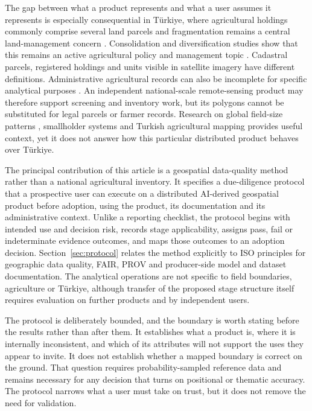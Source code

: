 \documentclass[pdflatex,sn-basic]{sn-jnl}
\begin{document}
The gap between what a product represents and what a user assumes it represents is especially consequential in Türkiye, where agricultural holdings commonly comprise several land parcels and fragmentation remains a central land-management concern \citep{sklenicka_classification_2016,turkish_statistical_institute_agricultural_2018,tanrivermis_assessment_2024}. Consolidation and diversification studies show that this remains an active agricultural policy and management topic \citep{ercan_land_2026}. Cadastral parcels, registered holdings and units visible in satellite imagery have different definitions. Administrative agricultural records can also be incomplete for specific analytical purposes \citep{yildiz_registration_2018}. An independent national-scale remote-sensing product may therefore support screening and inventory work, but its polygons cannot be substituted for legal parcels or farmer records. Research on global field-size patterns \citep{fritz_mapping_2015,lesiv_estimating_2019}, smallholder systems \citep{samberg_subnational_2016} and Turkish agricultural mapping \citep{tuzcu_kokal_use_2021} provides useful context, yet it does not answer how this particular distributed product behaves over Türkiye.

The principal contribution of this article is a geospatial data-quality method rather than a national agricultural inventory. It specifies a due-diligence protocol that a prospective user can execute on a distributed AI-derived geospatial product before adoption, using the product, its documentation and its administrative context. Unlike a reporting checklist, the protocol begins with intended use and decision risk, records stage applicability, assigns pass, fail or indeterminate evidence outcomes, and maps those outcomes to an adoption decision. Section~\ref{sec:protocol} relates the method explicitly to ISO principles for geographic data quality, FAIR, PROV and producer-side model and dataset documentation. The analytical operations are not specific to field boundaries, agriculture or Türkiye, although transfer of the proposed stage structure itself requires evaluation on further products and by independent users.

The protocol is deliberately bounded, and the boundary is worth stating before the results rather than after them. It establishes what a product is, where it is internally inconsistent, and which of its attributes will not support the uses they appear to invite. It does not establish whether a mapped boundary is correct on the ground. That question requires probability-sampled reference data \citep{olofsson_good_2014,stehman_key_2019} and remains necessary for any decision that turns on positional or thematic accuracy. The protocol narrows what a user must take on trust, but it does not remove the need for validation.
\end{document}
